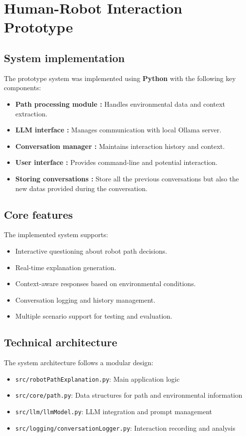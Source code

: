 \section{Human-Robot Interaction Prototype}

\subsection{System implementation}

The prototype system was implemented using \textbf{Python} with the following key components:
\begin{itemize}
    \item \textbf{Path processing module :} Handles environmental data and context extraction.
    \item \textbf{LLM interface :} Manages communication with local Ollama server.
    \item \textbf{Conversation manager :} Maintains interaction history and context.
    \item \textbf{User interface :} Provides command-line and potential interaction.
    \item \textbf{Storing conversations :} Store all the previous conversations but also the new datas provided during the conversation.
\end{itemize}

\subsection{Core features}

The implemented system supports:
\begin{itemize}
    \item Interactive questioning about robot path decisions.
    \item Real-time explanation generation.
    \item Context-aware responses based on environmental conditions.
    \item Conversation logging and history management.
    \item Multiple scenario support for testing and evaluation.
\end{itemize}

\subsection{Technical architecture}

The system architecture follows a modular design:
\begin{itemize}
    \item \texttt{src/robotPathExplanation.py}: Main application logic
    \item \texttt{src/core/path.py}: Data structures for path and environmental information
    \item \texttt{src/llm/llmModel.py}: LLM integration and prompt management
    \item \texttt{src/logging/conversationLogger.py}: Interaction recording and analysis
\end{itemize}

